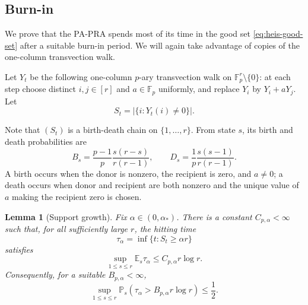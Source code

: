 \documentclass[11pt, reqno]{amsart}
\numberwithin{equation}{section}
\newtheorem{lemma}[theorem]{Lemma}
\newcommand{\Fp}{\mathbb F_p}
\newcommand{\Prob}{\mathbb P}
\newcommand{\E}{\mathbb E}
\begin{document}
\subsection{Burn-in}\label{subsec:heis-burnin}

We prove that the PA-PRA spends most of its time in the good set \eqref{eq:heis-good-set} after a suitable burn-in period. We will again take advantage of copies of the one-column transvection walk.

Let \(Y_t\) be the following one-column \(p\)-ary transvection walk on
\(\Fp^r\setminus\{0\}\): at each step choose distinct \(i,j\in[r]\) and
\(a\in\Fp\) uniformly, and replace \(Y_i\) by \(Y_i+aY_j\).  Let
\[
    S_t=|\{i:Y_t(i)\ne0\}|.
\]

Note that \((S_t)\) is a birth-death chain on \(\{1,\ldots,r\}\).  From state \(s\),
its birth and death probabilities are
\begin{equation}\label{eq:heis-support-birth-death}
    B_s=\frac{p-1}{p}\frac{s(r-s)}{r(r-1)},
    \qquad
    D_s=\frac1p\frac{s(s-1)}{r(r-1)}.
\end{equation}
A birth occurs when the donor is nonzero, the recipient is zero, and \(a\ne0\);
a death occurs when donor and recipient are both nonzero and the unique value
of \(a\) making the recipient zero is chosen.


\begin{lemma}[Support growth]\label{lem:heis-support-growth}
Fix \(\alpha\in(0,\alpha_*)\).  There is a constant \(C_{p,\alpha}<\infty\) such
that, for all sufficiently large \(r\), the hitting time
\[
    \tau_\alpha=\inf\{t:S_t\ge\alpha r\}
\]
satisfies
\begin{equation}\label{eq:heis-support-growth-mean}
    \sup_{1\le s\le r}\E_s\tau_\alpha\le C_{p,\alpha}r\log r.
\end{equation}
Consequently, for a suitable \(B_{p,\alpha}<\infty\),
\begin{equation}\label{eq:heis-support-hit-block}
    \sup_{1\le s\le r}\Prob_s(\tau_\alpha>B_{p,\alpha}r\log r)\le\frac12.
\end{equation}
\end{lemma}
\end{document}
